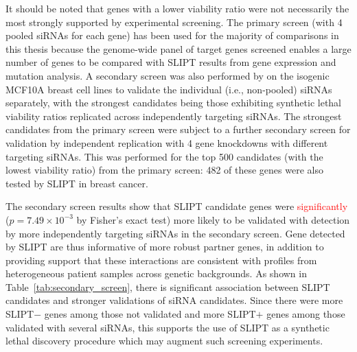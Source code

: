 It should be noted that genes with a lower viability ratio were not necessarily the most strongly supported by experimental screening. The primary screen (with 4 pooled \glspl{siRNA} for each gene) has been used for the majority of comparisons in this thesis because the \gls{genome}-wide panel of target genes screened enables a large number of genes to be compared with \gls{SLIPT} results from \gls{gene expression} and  \gls{mutation} analysis. A secondary screen was also performed by \citet{Telford2015} on the isogenic MCF10A breast cell lines to validate the individual (i.e., non-pooled) \glspl{siRNA} separately, with the strongest candidates being those exhibiting \gls{synthetic lethal} viability ratios replicated across independently targeting \glspl{siRNA}. The strongest candidates from the primary screen were subject to a further secondary screen for validation by independent replication with 4 gene knockdowns with different targeting \glspl{siRNA}. This was performed for the top 500 candidates (with the lowest viability ratio) from the primary screen: 482 of these genes were also tested by \gls{SLIPT} in breast cancer.%

The secondary screen results show that \gls{SLIPT} candidate genes were \textcolor{red}{significantly} ($p=7.49 \times 10^{-3}$ by Fisher's exact test) more  likely to be validated with detection by more independently targeting \glspl{siRNA} in the secondary screen. Gene detected by \gls{SLIPT} are thus informative of more robust partner genes, in addition to providing support that these interactions are consistent with  profiles from heterogeneous patient samples across genetic backgrounds. As shown in Table~\ref{tab:secondary_screen}, there is significant %
association between \gls{SLIPT} candidates and stronger validations of \gls{siRNA} candidates. Since there were more SLIPT$-$ genes among those not validated and more SLIPT$+$ genes among those validated with several \glspl{siRNA}, this supports the use of SLIPT as a \gls{synthetic lethal} discovery procedure which may augment such screening experiments.

